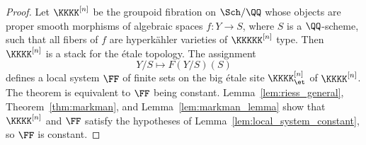%
%
%
%
%

\begin{proof}
    Let $\KKKK^{[n]}$ be the groupoid fibration on $\Sch/\QQ$ whose objects are proper smooth morphisms of algebraic spaces $f\colon Y \rightarrow S$, where $S$ is a $\QQ$-scheme, such that all fibers of $f$ are hyperk\"ahler varieties of $\KKKKK^{[n]}$ type. Then $\KKKK^{[n]}$ is a stack for the \'etale topology. The assignment
$$
Y/S \longmapsto F(Y/S)(S)
$$
defines a local system $\FF$ of finite sets on the big \'etale site $\KKKK^{[n]}_{\et}$ of $\KKKK^{[n]}$. The theorem is equivalent to $\FF$ being constant. Lemma~\ref{lem:riess_general}, Theorem~\ref{thm:markman}, and Lemma~\ref{lem:markman_lemma} show that $\KKKK^{[n]}$ and $\FF$ satisfy the hypotheses of Lemma~\ref{lem:local_system_constant}, so $\FF$ is constant.
\end{proof}

